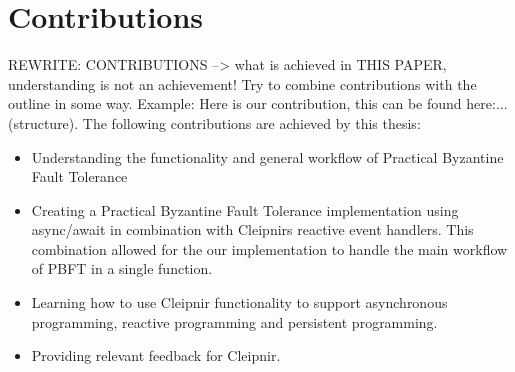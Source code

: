 \section{Contributions}
REWRITE: CONTRIBUTIONS --> what is achieved in THIS PAPER, understanding is not an achievement! Try to combine contributions with the outline in some way. Example: Here is our contribution, this can be found here:... (structure).
The following contributions are achieved by this thesis:
\begin{itemize}
\item Understanding the functionality and general workflow of Practical Byzantine Fault Tolerance
\item Creating a Practical Byzantine Fault Tolerance implementation using async/await in combination with Cleipnirs reactive event handlers. This combination allowed for the our implementation to handle the main workflow of PBFT in a single function.
\item Learning how to use Cleipnir functionality to support asynchronous programming, reactive programming and persistent programming.
\item Providing relevant feedback for Cleipnir.
\end{itemize}

